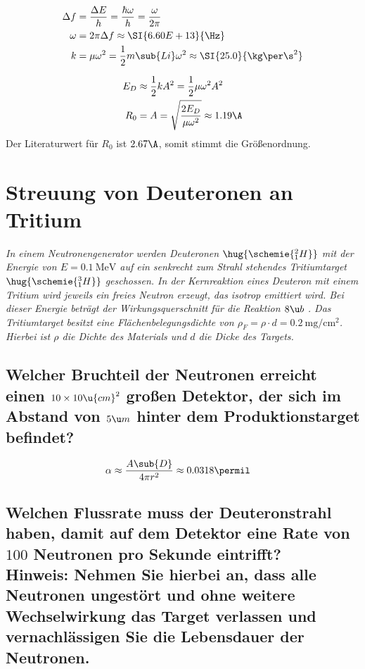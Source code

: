 \documentclass[ex]{exercise_4.1}
\begin{document}
\dottedlinett

\begin{align*}
    \Delta f &= \frac{\Delta E}{h} 
    = \frac{\hbar\omega }{h}
    = \frac{\omega}{2\pi}\\
    \omega &= 2\pi \Delta f \approx \SI{6.60E+13}{\Hz}\\
    k &= \mu \omega^2 = \frac12 m\sub{Li}\omega^2\approx \SI{25.0}{\kg\per\s^2}
\end{align*}

\begin{align*}
    E_D &\approx  \frac 12 k A^2 = \frac12 \mu\omega^2A^2 \\
    R_0&= A = \sqrt{\frac{2E_D}{\mu\omega^2}} \approx 1.19\A
\end{align*}
Der Literaturwert für \(R_0\) ist \(2.67\A\), somit stimmt die Größenordnung.

\section{Streuung von Deuteronen an Tritium}
{\it In einem Neutronengenerator werden Deuteronen $\hug{\schemie{^{2}_{1}H}}$ mit der Energie von $E = \SI{0.1}{\MeV}$  auf ein senkrecht zum Strahl stehendes Tritiumtarget $\hug{\schemie{^{3}_{1}H}}$ geschossen. In der Kernreaktion eines Deuteron mit einem Tritium wird jeweils ein freies Neutron erzeugt, das isotrop emittiert wird. Bei dieser Energie beträgt der Wirkungsquerschnitt für die Reaktion $8\u b$ . Das Tritiumtarget besitzt eine Flächenbelegungsdichte von $\rho_{F} = \rho \cdot d = \SI{0.2}{\mg\per\cm^2}$. Hierbei ist $\rho$ die Dichte des Materials und $d$ die Dicke des Targets.}

\subsection{Welcher Bruchteil der Neutronen erreicht einen $10 \times 10\u{cm}^{2}$ großen Detektor, der sich im Abstand von $5\u m $ hinter dem Produktionstarget befindet?}

\dottedlinete

\begin{align*}
    \alpha &\approx \frac{A\sub{D}}{4 \pi r^2} 
    \approx 0.0318\permil
\end{align*}

\subsection{Welchen Flussrate muss der Deuteronstrahl haben, damit auf dem Detektor eine Rate von $100$ Neutronen pro Sekunde eintrifft?\\
Hinweis: Nehmen Sie hierbei an, dass alle Neutronen ungestört und ohne weitere Wechselwirkung das Target verlassen und vernachlässigen Sie die Lebensdauer der Neutronen.}
\end{document}
